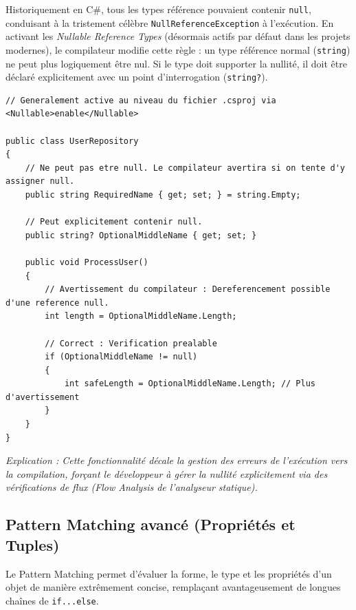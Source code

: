 Historiquement en C\#, tous les types référence pouvaient contenir \texttt{null}, conduisant à la tristement célèbre \texttt{NullReferenceException} à l'exécution. En activant les \textit{Nullable Reference Types} (désormais actifs par défaut dans les projets modernes), le compilateur modifie cette règle : un type référence normal (\texttt{string}) ne peut plus logiquement être nul. Si le type doit supporter la nullité, il doit être déclaré explicitement avec un point d'interrogation (\texttt{string?}).

\begin{lstlisting}[language={[Sharp]C}]
// Generalement active au niveau du fichier .csproj via <Nullable>enable</Nullable>

public class UserRepository
{
    // Ne peut pas etre null. Le compilateur avertira si on tente d'y assigner null.
    public string RequiredName { get; set; } = string.Empty;

    // Peut explicitement contenir null.
    public string? OptionalMiddleName { get; set; }
    
    public void ProcessUser()
    {
        // Avertissement du compilateur : Dereferencement possible d'une reference null.
        int length = OptionalMiddleName.Length; 
        
        // Correct : Verification prealable
        if (OptionalMiddleName != null)
        {
            int safeLength = OptionalMiddleName.Length; // Plus d'avertissement
        }
    }
}
\end{lstlisting}
\textit{Explication : Cette fonctionnalité décale la gestion des erreurs de l'exécution vers la compilation, forçant le développeur à gérer la nullité explicitement via des vérifications de flux (Flow Analysis de l'analyseur statique).}

\subsection{Pattern Matching avancé (Propriétés et Tuples)}

Le Pattern Matching permet d'évaluer la forme, le type et les propriétés d'un objet de manière extrêmement concise, remplaçant avantageusement de longues chaînes de \texttt{if...else}.

